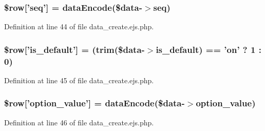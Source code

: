 \hypertarget{administration_2lists_2data__create_8ejs_8php_af07faae4f0734e368a485f115669527e}{
\subsubsection[{\$row}]{\setlength{\rightskip}{0pt plus 5cm}\$row\mbox{[}'seq'\mbox{]} = {\bf data\-Encode}(\$data-\/$>$seq)}}\label{administration_2lists_2data__create_8ejs_8php_af07faae4f0734e368a485f115669527e}


\-Definition at line 44 of file data\-\_\-create.\-ejs.\-php.

\hypertarget{administration_2lists_2data__create_8ejs_8php_afb2c758deaface994a3fbc212ded12cd}{
\subsubsection[{\$row}]{\setlength{\rightskip}{0pt plus 5cm}\$row\mbox{[}'is\-\_\-default'\mbox{]} = (trim(\$data-\/$>$is\-\_\-default) == 'on' ? 1 \-: 0)}}\label{administration_2lists_2data__create_8ejs_8php_afb2c758deaface994a3fbc212ded12cd}


\-Definition at line 45 of file data\-\_\-create.\-ejs.\-php.

\hypertarget{administration_2lists_2data__create_8ejs_8php_a48eb30eb1a910d28f11f62cf48b97401}{
\subsubsection[{\$row}]{\setlength{\rightskip}{0pt plus 5cm}\$row\mbox{[}'option\-\_\-value'\mbox{]} = {\bf data\-Encode}(\$data-\/$>$option\-\_\-value)}}\label{administration_2lists_2data__create_8ejs_8php_a48eb30eb1a910d28f11f62cf48b97401}


\-Definition at line 46 of file data\-\_\-create.\-ejs.\-php.

